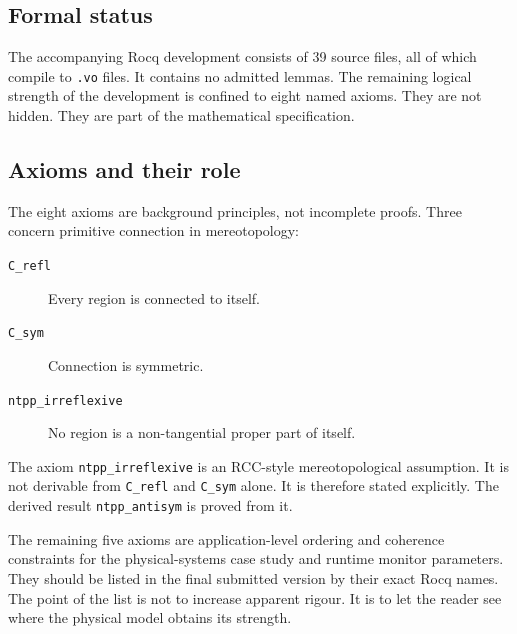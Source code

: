 \documentclass[a4paper,11pt]{article}
\begin{document}
\subsection{Formal status}

The accompanying Rocq development consists of 39 source files, all of which
compile to \texttt{.vo} files. It contains no admitted lemmas. The remaining
logical strength of the development is confined to eight named axioms. They are
not hidden. They are part of the mathematical specification.

\subsection{Axioms and their role}
\label{subsec:axioms-role}

The eight axioms are background principles, not incomplete proofs. Three concern
primitive connection in mereotopology:

\begin{description}
\item[\texttt{C\_refl}] Every region is connected to itself.
\item[\texttt{C\_sym}] Connection is symmetric.
\item[\texttt{ntpp\_irreflexive}] No region is a non-tangential proper part of
itself.
\end{description}

The axiom \texttt{ntpp\_irreflexive} is an RCC-style mereotopological
assumption. It is not derivable from \texttt{C\_refl} and \texttt{C\_sym}
alone. It is therefore stated explicitly. The derived result
\texttt{ntpp\_antisym} is proved from it.

The remaining five axioms are application-level ordering and coherence
constraints for the physical-systems case study and runtime monitor parameters.
They should be listed in the final submitted version by their exact Rocq names.
The point of the list is not to increase apparent rigour. It is to let the
reader see where the physical model obtains its strength.
\end{document}
